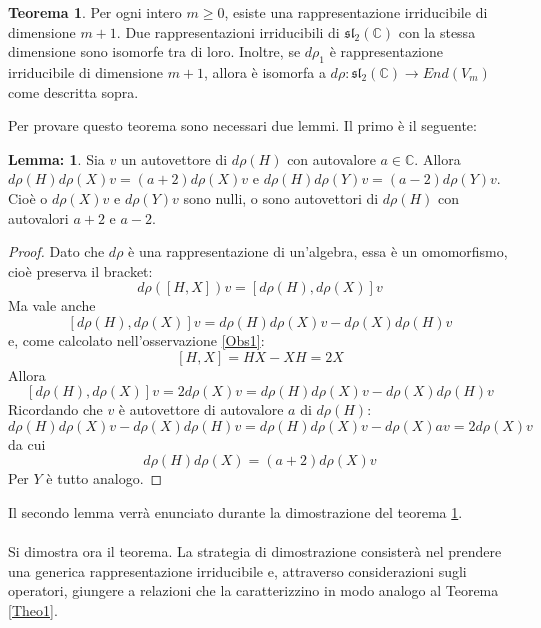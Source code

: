 \documentclass[12pt,a4paper]{report}
\theoremstyle{definition}
\theoremstyle{Theorem}
\newtheorem{Theo}[Def]{Teorema}
\theoremstyle{definition}
\theoremstyle{definition}
\newtheorem{Lem}[Def]{Lemma:}
\theoremstyle{definition}
\begin{document}
\begin{Theo}\label{Theo2}
	Per ogni intero $m\geq 0$, esiste una rappresentazione irriducibile di dimensione $m+1$. Due rappresentazioni irriducibili di $\mathfrak{sl_2(\mathbb{C})}$ con la stessa dimensione sono isomorfe tra di loro. Inoltre, se $d\rho_1$ è rappresentazione irriducibile di dimensione $m+1$, allora è isomorfa a $d\rho:\mathfrak{sl_2(\mathbb{C})}\rightarrow End(V_m)$ come descritta sopra.
\end{Theo}
Per provare questo teorema sono necessari due lemmi. Il primo  è il seguente:
\begin{Lem}\label{Lemma1}
	Sia $v$ un autovettore di $d\rho(H)$ con autovalore $a\in\mathbb{C}$. Allora $d\rho(H)d\rho(X)v=(a+2)d\rho(X)v$ e $d\rho(H)d\rho(Y)v=(a-2)d\rho(Y)v$. Cioè o $d\rho(X)v$ e $d\rho(Y)v$ sono nulli, o sono autovettori di $d\rho(H)$ con autovalori $a+2$ e $a-2$.
\end{Lem}
\begin{proof}
	Dato che $d\rho$ è una rappresentazione di un'algebra, essa è un omomorfismo, cioè preserva il bracket:\\ $$d\rho([H,X])v=[d\rho(H),d\rho(X)]v$$
	Ma vale anche $$[d\rho(H),d\rho(X)]v=d\rho(H)d\rho(X)v-d\rho(X)d\rho(H)v$$ e, come calcolato nell'osservazione \ref{Obs1}: $$[H,X]=HX-XH=2X$$ 
	Allora $$[d\rho(H),d\rho(X)]v=2d\rho(X)v=d\rho(H)d\rho(X)v-d\rho(X)d\rho(H)v$$ 
	Ricordando che $v$ è autovettore di autovalore $a$ di $d\rho(H)$:
	$$d\rho(H)d\rho(X)v-d\rho(X)d\rho(H)v=d\rho(H)d\rho(X)v-d\rho(X)av=2d\rho(X)v$$ da cui
	$$d\rho(H)d\rho(X)=(a+2)d\rho(X)v$$ 
	Per $Y$ è tutto analogo.
\end{proof}
Il secondo lemma verrà enunciato durante la dimostrazione del teorema \ref{Theo2}.\\\\
Si dimostra ora il teorema. La strategia di dimostrazione consisterà nel prendere una generica rappresentazione irriducibile e, attraverso considerazioni sugli operatori, giungere a relazioni che la caratterizzino in modo analogo al Teorema \ref{Theo1}.
\end{document}
